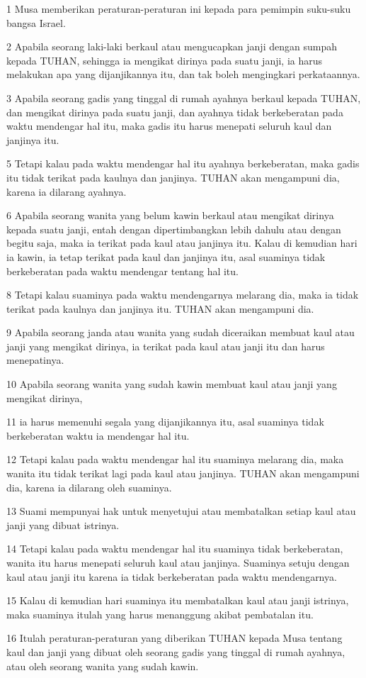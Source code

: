 \par 1 Musa memberikan peraturan-peraturan ini kepada para pemimpin suku-suku bangsa Israel.
\par 2 Apabila seorang laki-laki berkaul atau mengucapkan janji dengan sumpah kepada TUHAN, sehingga ia mengikat dirinya pada suatu janji, ia harus melakukan apa yang dijanjikannya itu, dan tak boleh mengingkari perkataannya.
\par 3 Apabila seorang gadis yang tinggal di rumah ayahnya berkaul kepada TUHAN, dan mengikat dirinya pada suatu janji, dan ayahnya tidak berkeberatan pada waktu mendengar hal itu, maka gadis itu harus menepati seluruh kaul dan janjinya itu.
\par 5 Tetapi kalau pada waktu mendengar hal itu ayahnya berkeberatan, maka gadis itu tidak terikat pada kaulnya dan janjinya. TUHAN akan mengampuni dia, karena ia dilarang ayahnya.
\par 6 Apabila seorang wanita yang belum kawin berkaul atau mengikat dirinya kepada suatu janji, entah dengan dipertimbangkan lebih dahulu atau dengan begitu saja, maka ia terikat pada kaul atau janjinya itu. Kalau di kemudian hari ia kawin, ia tetap terikat pada kaul dan janjinya itu, asal suaminya tidak berkeberatan pada waktu mendengar tentang hal itu.
\par 8 Tetapi kalau suaminya pada waktu mendengarnya melarang dia, maka ia tidak terikat pada kaulnya dan janjinya itu. TUHAN akan mengampuni dia.
\par 9 Apabila seorang janda atau wanita yang sudah diceraikan membuat kaul atau janji yang mengikat dirinya, ia terikat pada kaul atau janji itu dan harus menepatinya.
\par 10 Apabila seorang wanita yang sudah kawin membuat kaul atau janji yang mengikat dirinya,
\par 11 ia harus memenuhi segala yang dijanjikannya itu, asal suaminya tidak berkeberatan waktu ia mendengar hal itu.
\par 12 Tetapi kalau pada waktu mendengar hal itu suaminya melarang dia, maka wanita itu tidak terikat lagi pada kaul atau janjinya. TUHAN akan mengampuni dia, karena ia dilarang oleh suaminya.
\par 13 Suami mempunyai hak untuk menyetujui atau membatalkan setiap kaul atau janji yang dibuat istrinya.
\par 14 Tetapi kalau pada waktu mendengar hal itu suaminya tidak berkeberatan, wanita itu harus menepati seluruh kaul atau janjinya. Suaminya setuju dengan kaul atau janji itu karena ia tidak berkeberatan pada waktu mendengarnya.
\par 15 Kalau di kemudian hari suaminya itu membatalkan kaul atau janji istrinya, maka suaminya itulah yang harus menanggung akibat pembatalan itu.
\par 16 Itulah peraturan-peraturan yang diberikan TUHAN kepada Musa tentang kaul dan janji yang dibuat oleh seorang gadis yang tinggal di rumah ayahnya, atau oleh seorang wanita yang sudah kawin.

